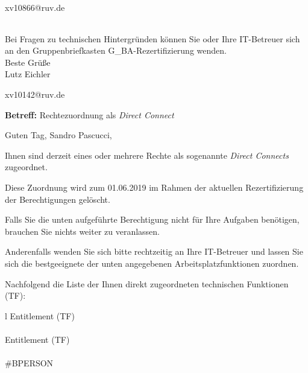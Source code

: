 \documentclass[a4paper,landscape,12pt]{letter}
\begin{document}
\begin{letter}{xv10866@ruv.de\hfill \break}
\begin{tiny}
\begin{longtable}{|p{35mm}|p{15mm}|p{25mm}|p{10mm}|p{40mm}|p{50mm}|p{50mm}|}
\hline
		\end{longtable}
		\end{tiny}
	
\begin{minipage}{\textwidth}
			Bei Fragen zu technischen Hintergründen können Sie 
			oder Ihre IT-Betreuer sich an den Gruppenbriefkasten 
			G\_BA-Rezertifizierung
			wenden.\\
			\linebreak
			Beste Grüße\\
			Lutz Eichler
	\end{minipage}
	\end{letter}
	
\begin{letter}{xv10142@ruv.de\hfill \break}
\begin{normalsize}
	\opening{\textbf{Betreff:} Rechtezuordnung als \emph{Direct Connect}}
	\begin{normalsize} \hfill
	\end{normalsize}

	\begin{normalsize}
		Guten Tag, 
	Sandro Pascucci, \hfill \break
	\end{normalsize}
	\end{normalsize}
	
\begin{normalsize}
	Ihnen sind derzeit eines oder mehrere Rechte als sogenannte \emph{Direct Connects} zugeordnet.
	
	Diese Zuordnung wird zum 01.06.2019 im Rahmen der aktuellen Rezertifizierung der Berechtigungen gelöscht.
	
	Falls Sie die unten aufgeführte Berechtigung nicht für Ihre Aufgaben benötigen, 
	brauchen Sie nichts weiter zu veranlassen.
	
	Anderenfalls wenden Sie sich bitte rechtzeitig an Ihre IT-Betreuer 
	und lassen Sie sich die bestgeeignete der unten angegebenen Arbeitsplatzfunktionen zuordnen.
	\end{normalsize}
	
\begin{normalsize}
	Nachfolgend die Liste der Ihnen direkt zugeordneten technischen Funktionen (TF):

	\begin{longtable}{l}
		Entitlement (TF) \\ \hline
		\endfirsthead
		\\\hline
		Entitlement (TF) \\ \hline
		\endhead %
		\multicolumn{1}{r@{}}{Fortsetzung \ldots}\\
		\endfoot
		\hline
		\endlastfoot
	\#BPERSON\\
	\end{longtable}
	\end{normalsize}
	

\end{letter}
\end{document}
